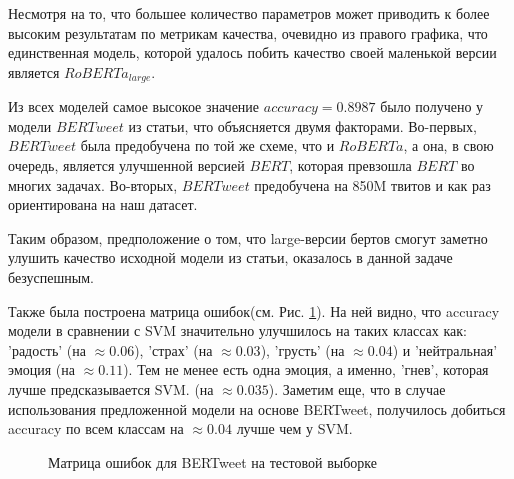 \documentclass{article}
\begin{document}
Несмотря на то, что большее количество параметров может приводить к более высоким результатам по метрикам качества, очевидно из правого графика, что единственная модель, которой удалось побить качество своей маленькой версии является $RoBERTa_{large}$.

Из всех моделей самое высокое значение $accuracy = 0.8987$ было получено у модели $BERTweet$ из статьи, что объясняется двумя факторами. Во-первых, $BERTweet$ была предобучена по той же схеме, что и $RoBERTa$, а она, в свою очередь, является улучшенной версией $BERT$, которая превзошла $BERT$ во многих задачах. Во-вторых, $BERTweet$ предобучена на 850M твитов и как раз ориентирована на наш датасет.

Таким образом, предположение о том, что large-версии бертов смогут заметно улушить качество исходной модели из статьи, оказалось в данной задаче безуспешным.

Также была построена матрица ошибок(см. Рис. \ref{eq:conf_matr2}). На ней видно, что accuracy модели в сравнении с SVM значительно улучшилось на таких классах как: 'радость' (на $\approx\! 0.06$), 'страх' (на $\approx\! 0.03$), 'грусть' (на $\approx\! 0.04$) и 'нейтральная' эмоция (на $\approx\! 0.11$). Тем не менее есть одна эмоция, а именно, 'гнев', которая лучше предсказывается SVM. (на $\approx\! 0.035$). Заметим еще, что в случае использования предложенной модели на основе BERTweet, получилось добиться accuracy по всем классам на $\approx\! 0.04$ лучше чем у SVM.
\begin{figure}[h]
	
    \caption{\centering Матрица ошибок для BERTweet на тестовой выборке}
	\label{eq:conf_matr2}
\end{figure} 
\end{document}
